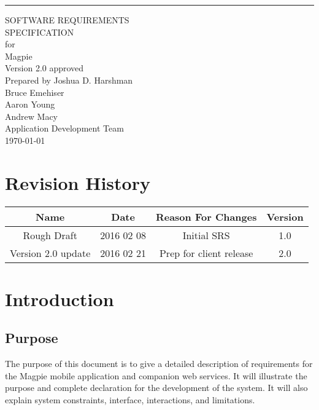 \documentclass{scrreprt}
\date{}
\def\myversion{2.0 }
\begin{document}
\begin{flushright}
    \rule{16cm}{5pt}\vskip1cm
    \begin{bfseries}
        \Huge{SOFTWARE REQUIREMENTS\\ SPECIFICATION}\\
        \vspace{1.9cm}
        for\\
        \vspace{1.9cm}
        Magpie\\
        \vspace{1.9cm}
        \LARGE{Version \myversion approved}\\
        \vspace{1.9cm}
        Prepared by Joshua D. Harshman\\Bruce Emehiser\\Aaron Young\\Andrew Macy\\
        \vspace{1.9cm}
        Application Development Team\\
        \vspace{1.9cm}
        \today\\
    \end{bfseries}
\end{flushright}

\tableofcontents

\chapter*{Revision History}

\begin{center}
    \begin{tabular}{|c|c|c|c|}
        \hline
	    Name & Date & Reason For Changes & Version \\
        \hline
	    Rough Draft & 2016 02 08 & Initial SRS & 1.0 \\
        \hline
        Version 2.0 update & 2016 02 21 & Prep for client release & 2.0 \\
    \end{tabular}
\end{center}

\chapter{Introduction}

\section{Purpose}
The purpose of this document is to give a detailed description of requirements for
the Magpie mobile application and companion web services. It will illustrate the purpose
and complete declaration for the development of the system.  It will also explain system
constraints, interface, interactions, and limitations.
\end{document}
